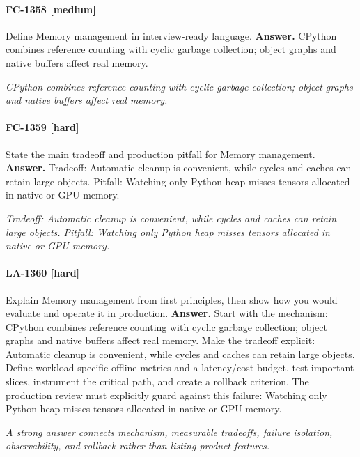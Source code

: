 \paragraph{FC-1358 [medium]} Define Memory management in interview-ready language.
\noindent\textbf{Answer.} CPython combines reference counting with cyclic garbage collection; object graphs and native buffers affect real memory.
\par\textit{CPython combines reference counting with cyclic garbage collection; object graphs and native buffers affect real memory.}
\paragraph{FC-1359 [hard]} State the main tradeoff and production pitfall for Memory management.
\noindent\textbf{Answer.} Tradeoff: Automatic cleanup is convenient, while cycles and caches can retain large objects. Pitfall: Watching only Python heap misses tensors allocated in native or GPU memory.
\par\textit{Tradeoff: Automatic cleanup is convenient, while cycles and caches can retain large objects. Pitfall: Watching only Python heap misses tensors allocated in native or GPU memory.}
\paragraph{LA-1360 [hard]} Explain Memory management from first principles, then show how you would evaluate and operate it in production.
\noindent\textbf{Answer.} Start with the mechanism: CPython combines reference counting with cyclic garbage collection; object graphs and native buffers affect real memory. Make the tradeoff explicit: Automatic cleanup is convenient, while cycles and caches can retain large objects. Define workload-specific offline metrics and a latency/cost budget, test important slices, instrument the critical path, and create a rollback criterion. The production review must explicitly guard against this failure: Watching only Python heap misses tensors allocated in native or GPU memory.
\par\textit{A strong answer connects mechanism, measurable tradeoffs, failure isolation, observability, and rollback rather than listing product features.}
